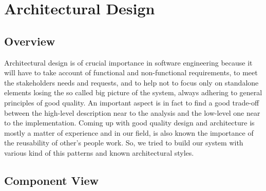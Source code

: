 %
%
\chapter{Architectural Design}
%
\label{cap:architecturaldesign}
%
%
\section{Overview}
Architectural design is of crucial importance in software engineering because it will have to take account of functional and non-functional requirements, to meet the stakeholders needs and requests, and to help not to focus only on standalone elements losing the so called big picture of the system, always adhering to general principles of good quality. An important aspect is in fact to find a good trade-off between the high-level description near to the analysis and the low-level one near to the implementation.
Coming up with good quality design and architecture is mostly a matter of experience and in our field, is also known the importance of the reusability of other’s people work. So, we tried to build our system with various kind of this patterns and known architectural styles.

%
%
\section{Component View}
